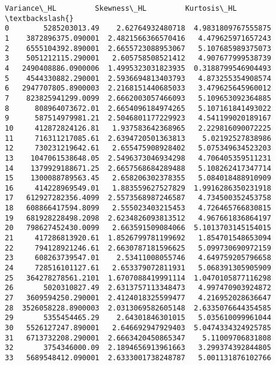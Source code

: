 \documentclass[11pt]{article}
\begin{document}
\begin{tcolorbox}[breakable, size=fbox, boxrule=.5pt, pad at break*=1mm, opacityfill=0]
\begin{Verbatim}[commandchars=\\\{\}]
           Variance\_HL         Skewness\_HL         Kurtosis\_HL  \textbackslash{}
0        5285203013.49    2.62764932480718  4.9831809767555875
1    3872896375.090001  2.4821566366570416   4.479625971657243
2    6555104392.890001  2.6655723088953067   5.107685989375073
3    5051212115.290001   2.605758508521412   4.907677999538739
4   2490408886.0900006  1.4995323031823935  0.3188799546904493
5    4544330882.290001  2.5936694813403793   4.873255354908574
6   2947707805.8900003  2.2168151440685033   3.479625645960012
7    823825941299.0099  2.6662003057466093   5.109653092364885
8      808964073672.01  2.6654096184974265   5.107161841493022
9      587514979981.21  2.5046801177229923   4.541199020189167
10     412872824126.81   1.937583642368965   2.229816090072225
11     716311217085.61  2.6394720501363813    5.02192527838986
12     730231219642.61   2.655475908928402   5.075349634523203
13    1047061538648.05  2.5496373046934298   4.706405359511231
14    1379929188671.25  2.6657568684289488   5.108262417347714
15    1300088789563.45   2.658206302378355   5.084018488910909
16     414228969549.01   1.883559627527829  1.9916286350231918
17   612927282356.4099  2.5573568987246587   4.734500352453758
18   608866417594.8099   2.555023403215453   4.726465766830815
19   681928228498.2098  2.6234826093813512   4.967661836864197
20   798627452430.0099   2.663591509084066  5.1013703145154015
21     417286813920.61  1.8526799781199692   1.854701548653094
22     794128921246.61  2.6630787181596625   5.099730690972159
23     608263739547.01    2.53411008055746   4.649759205796658
24     728516101127.61   2.653379072811931   5.068391305905909
25   364278278561.2101  1.6707088419991114  1.0470105877116298
26       5020310827.49  2.6313757113348473   4.997470903924872
27   3609594250.290001  2.4124018325599477   4.216952028636647
28  3526058228.8900003  2.0313069582605148  2.6335076644354585
29       5355454465.29    2.64301846301015   5.035610099961044
30   5526127247.890001   2.646692947929403  5.0474334324925785
31   6713732208.290001  2.6663420450865347    5.11009706831808
32       3754346000.09  2.1894656913961663   3.299374392844805
33   5689548412.090001  2.6333001738248787   5.001131876102766


\end{Verbatim}
\end{tcolorbox}
\end{document}
